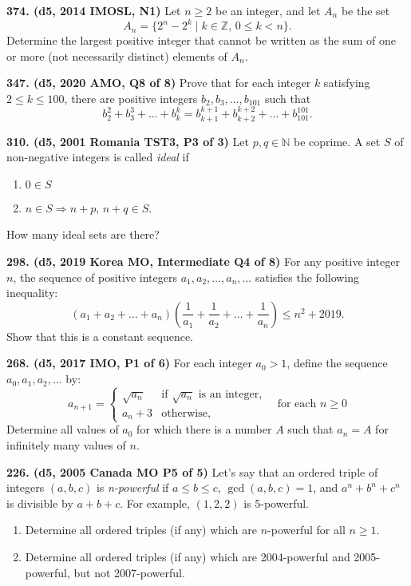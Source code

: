 \documentclass{article}
\begin{document}
\textbf{374. (\color{red}d5\color{black}, 2014 IMOSL, N1)} Let $n \ge 2$ be an integer, and let $A_n$ be the set \[A_n = \{2^n  - 2^k\mid k \in \mathbb{Z},\, 0 \le k < n\}.\] Determine the largest positive integer that cannot be written as the sum of one or more (not necessarily distinct) elements of $A_n$.

\textbf{347. (\color{red}d5\color{black}, 2020 AMO, Q8 of 8)} Prove that for each integer $k$ satisfying $2 \leq k \leq 100$, there are positive integers $b_2, b_3, \dots, b_{101}$ such that
\[b_2^2 + b_3^3 + \dots + b_k^k = b_{k+1}^{k+1} + b_{k+2}^{k+2} + \dots + b_{101}^{101}.\]

\textbf{310. (\color{red}d5\color{black}, 2001 Romania TST3, P3 of 3)} Let $p, q \in \mathbb{N}$ be coprime. A set $S$ of non-negative integers is called \emph{ideal} if \begin{enumerate}\item{$0 \in S$}\item{$n \in S \Rightarrow n+p, \, n+q \in S$.}\end{enumerate} How many ideal sets are there?

\textbf{298. (\color{red}d5\color{black}, 2019 Korea MO, Intermediate Q4 of 8)} For any positive integer $n$, the sequence of positive integers $a_1, a_2, \dots, a_n, \dots$ satisfies the following inequality:
$$\left ( a_1 + a_2 + \dots + a_n \right ) \left ( \frac{1}{a_1} + \frac{1}{a_2} + \dots + \frac{1}{a_n} \right ) \leq n^2 + 2019.$$
Show that this is a constant sequence.

\textbf{268. (\color{red}d5\color{black}, 2017 IMO, P1 of 6)} For each integer $a_0 > 1$, define the sequence $a_0, a_1, a_2, \dots$ by:
\begin{equation*}
    a_{n+1} =
    \begin{cases}
        \sqrt{a_n} & \text{if } \sqrt{a_n} \text{ is an integer,} \\
        a_n + 3    & \text{otherwise,}
    \end{cases}
    \quad \text{for each } n \geq 0
\end{equation*}
Determine all values of $a_0$ for which there is a number $A$ such that $a_n = A$ for infinitely many values of $n$.

\textbf{226. (\color{red}d5\color{black}, 2005 Canada MO P5 of 5)} Let's say that an ordered triple of integers \((a,b,c)\) is \textit{n-powerful} if \(a \leq b \leq c\), \(\gcd(a,b,c) = 1\), and \(a^n + b^n + c^n\) is divisible by \(a + b + c\). For example, \((1,2,2)\) is 5-powerful.\begin{enumerate}
    \item Determine all ordered triples (if any) which are \(n\)-powerful for all \(n \geq 1\).
    \item Determine all ordered triples (if any) which are 2004-powerful and 2005-powerful, but not 2007-powerful.
\end{enumerate}
\end{document}
